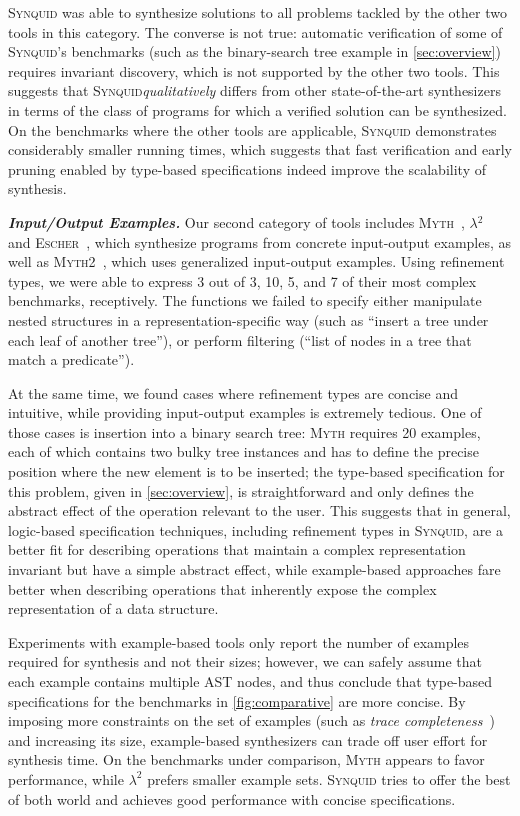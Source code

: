\documentclass[10pt,preprint]{sigplanconf-pldi16}
\theoremstyle{definition}
\newcommand{\custompar}[1]{\parskip 0pt \textbf{\textit{#1}}}
\newcommand{\tool}{\textsc{Synquid}\xspace}
\begin{document}
\tool was able to synthesize solutions to all problems tackled by the other two tools in this category.
The converse is not true: automatic verification of some of \tool's benchmarks (such as the binary-search tree example in \autoref{sec:overview}) 
requires invariant discovery, which is not supported by the other two tools. 
This suggests that \tool \emph{qualitatively} differs from other state-of-the-art synthesizers in terms of the class of programs for which a verified solution can be synthesized.
On the benchmarks where the other tools are applicable, \tool demonstrates considerably smaller running times,
which suggests that fast verification and early pruning enabled by type-based specifications indeed improve the scalability of synthesis. 

\custompar{Input/Output Examples.}
Our second category of tools includes \textsc{Myth}~\cite{OseraZd15}, \textsc{$\lambda^2$}~\cite{FeserChDi15} and \textsc{Escher}~\cite{AlbarghouthiGuKi13},
which synthesize programs from concrete input-output examples,
as well as \textsc{Myth2}~\cite{FrankleOWZ16}, which uses generalized input-output examples.
Using refinement types, we were able to express 3 out of 3, 10, 5, and 7 of their most complex benchmarks, receptively.
The functions we failed to specify either manipulate nested structures in a representation-specific way (such as ``insert a tree under each leaf of another tree''),
or perform filtering (``list of nodes in a tree that match a predicate'').

At the same time, we found cases where refinement types are concise and intuitive, 
while providing input-output examples is extremely tedious.
One of those cases is insertion into a binary search tree:
\textsc{Myth} requires 20 examples,
each of which contains two bulky tree instances and has to define the precise position where the new element is to be inserted;
the type-based specification for this problem, given in \autoref{sec:overview}, 
is straightforward and only defines the abstract effect of the operation relevant to the user. 
This suggests that in general, logic-based specification techniques, including refinement types in \tool, 
are a better fit for describing operations that maintain a complex representation invariant but have a simple abstract effect,
while example-based approaches fare better when describing operations that inherently expose the complex representation of a data structure.

Experiments with example-based tools only report the number of examples required for synthesis and not their sizes;
however, we can safely assume that each example contains multiple AST nodes,
and thus conclude that type-based specifications for the benchmarks in \autoref{fig:comparative} are more concise.
By imposing more constraints on the set of examples (such as \emph{trace completeness}~\cite{OseraZd15}) and increasing its size,
example-based synthesizers can trade off user effort for synthesis time.
On the benchmarks under comparison, \textsc{Myth} appears to favor performance, while $\lambda^2$ prefers smaller example sets.
\tool tries to offer the best of both world and achieves good performance with concise specifications.
\end{document}
